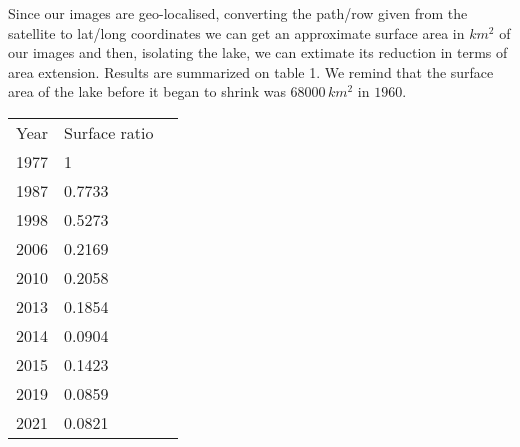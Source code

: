Since our images are geo-localised, converting the path/row given from the satellite to lat/long coordinates we can get an approximate surface area in $km^2$ of our images and then, isolating the lake, we can extimate its reduction in terms of area extension. 
Results are summarized on table 1. We remind that the surface area of the lake before it began to shrink was $68000\,km^2$ in $1960$.  
\begin{table}[]
	\centering
\begin{tabular}{|l|l|l}
\cline{1-2}
Year & Surface ratio &  \\ \cline{1-2}
1977 & 1             &  \\ \cline{1-2}
1987 & 0.7733        &  \\ \cline{1-2}
1998 & 0.5273        &  \\ \cline{1-2}
2006 & 0.2169        &  \\ \cline{1-2}
2010 & 0.2058        &  \\ \cline{1-2}
2013 & 0.1854        &  \\ \cline{1-2}
2014 & 0.0904        &  \\ \cline{1-2}
2015 & 0.1423        &  \\ \cline{1-2}
2019 & 0.0859        &  \\ \cline{1-2}
2021 & 0.0821        &  \\ \cline{1-2}
\end{tabular}
\end{table}
